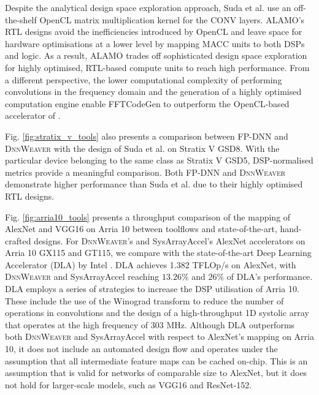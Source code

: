 \documentclass[format=acmsmall, review=false, screen=true]{acmart}
\begin{document}
Despite the analytical design space exploration approach, Suda et al. use an off-the-shelf OpenCL matrix multiplication kernel for the CONV layers. ALAMO's RTL designs avoid the inefficiencies introduced by OpenCL and leave space for hardware optimisations at a lower level by mapping MACC units to both DSPs and logic. As a result, ALAMO trades off sophisticated design space exploration for highly optimised, RTL-based compute units to reach high performance. {\color{black}From a different perspective, the lower computational complexity of performing convolutions in the frequency domain and the generation of a highly optimised computation engine enable FFTCodeGen to outperform the OpenCL-based accelerator of \cite{Suda_2016}.}

Fig. \ref{fig:stratix_v_tools} also presents a comparison between FP-DNN and \textsc{DnnWeaver} with the design of Suda et al. on Stratix V GSD8. With the particular device belonging to the same class as Stratix V GSD5, DSP-normalised metrics provide a meaningful comparison. Both FP-DNN and \textsc{DnnWeaver} demonstrate higher performance than Suda et al. due to their highly optimised RTL designs.

Fig. \ref{fig:arria10_tools} presents a throughput comparison of the mapping of AlexNet and VGG16 on Arria 10 between toolflows and state-of-the-art, hand-crafted designs. For \textsc{DnnWeaver}'s and SysArrayAccel's AlexNet accelerators on Arria 10 GX115 and GT115, we compare with the state-of-the-art Deep Learning Accelerator (DLA) by Intel \cite{Aydonat_2017}. DLA achieves 1.382 TFLOp/s on AlexNet, with \textsc{DnnWeaver} and SysArrayAccel reaching $13.26 \%$ and $26 \%$ of DLA's performance. DLA employs a series of strategies to increase the DSP utilisation of Arria 10. These include the use of the Winograd transform to reduce the number of operations in convolutions and the design of a high-throughput 1D systolic array that operates at the high frequency of 303 MHz. Although DLA outperforms both \textsc{DnnWeaver} and SysArrayAccel with respect to AlexNet's mapping on Arria 10, it does not include an automated design flow and operates under the assumption that all intermediate feature maps can be cached on-chip. This is an assumption that is valid for networks of comparable size to AlexNet, but it does not hold for larger-scale models, such as VGG16 and ResNet-152.
\end{document}
